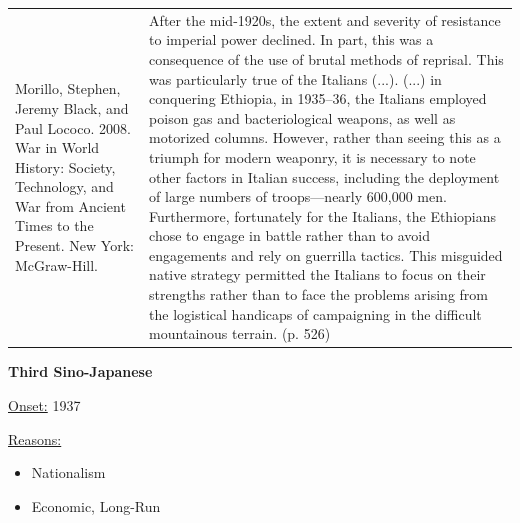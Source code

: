 {\begin{longtable}{p{}p{}}
\\
Morillo, Stephen, Jeremy Black, and Paul Lococo. 2008. War in World History: Society, Technology, and War from Ancient Times to the Present. New York: McGraw-Hill. & After the mid-1920s, the extent and severity of resistance to imperial power declined. In part, this was a consequence of the use of brutal methods of reprisal. This was particularly true of the Italians (...). (...) in conquering Ethiopia, in 1935–36,  the Italians employed poison gas and bacteriological weapons, as well as motorized columns. However, rather than seeing this as a triumph for modern weaponry, it is necessary to note other factors in Italian success, including the deployment of large numbers of troops—nearly 600,000 men. Furthermore, fortunately for the Italians, the Ethiopians chose to engage in battle rather than to avoid engagements and rely on guerrilla tactics. This misguided native strategy permitted the Italians to focus on their strengths rather than to face the problems arising from the logistical handicaps of campaigning in the difficult mountainous terrain. (p. 526)
\\
\end{longtable}}
\clearpage
         \textbf{Third Sino-Japanese} 

          \underline{Onset:} 1937         

\underline{Reasons:}
\begin{itemize}
\item Nationalism
\item Economic, Long-Run
\end{itemize}

